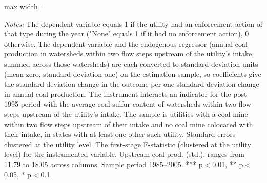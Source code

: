 \begin{table}[htbp]
{\begin{adjustbox}{max width=\linewidth}
\begin{tabular}
\bottomrule
\end{tabular}
\end{adjustbox}
}
\begin{minipage}{\linewidth}
\vspace{4pt}
\footnotesize
\raggedright
\textit{Notes:} The dependent variable equals 1 if the utility had an enforcement action of that type during the year ("None" equals 1 if it had no enforcement action), 0 otherwise. The dependent variable and the endogenous regressor (annual coal production in watersheds within two flow steps upstream of the utility's intake, summed across those watersheds) are each converted to standard deviation units (mean zero, standard deviation one) on the estimation sample, so coefficients give the standard-deviation change in the outcome per one-standard-deviation change in annual coal production. The instrument interacts an indicator for the post-1995 period with the average coal sulfur content of watersheds within two flow steps upstream of the utility's intake. The sample is utilities with a coal mine within two flow steps upstream of their intake and no coal mine colocated with their intake, in states with at least one other such utility. Standard errors clustered at the utility level. The first-stage F-statistic (clustered at the utility level) for the instrumented variable, Upstream coal prod. (std.), ranges from 11.79 to 18.05 across columns. Sample period 1985--2005. *** p$<$0.01, ** p$<$0.05, * p$<$0.1.
\end{minipage}
\end{table}
